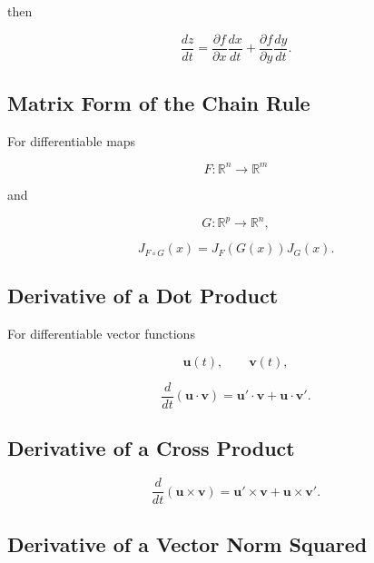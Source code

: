 then

\[
\boxed{
\frac{dz}{dt}
=
\frac{\partial f}{\partial x}
\frac{dx}{dt}
+
\frac{\partial f}{\partial y}
\frac{dy}{dt}.
}
\]

\subsection{Matrix Form of the Chain Rule}
\label{subsec:matrix-chain-rule-reference}

For differentiable maps

\[
F:\mathbb{R}^n\to\mathbb{R}^m
\]

and

\[
G:\mathbb{R}^p\to\mathbb{R}^n,
\]

\[
\boxed{
J_{F\circ G}(x)
=
J_F(G(x))
J_G(x).
}
\]

\subsection{Derivative of a Dot Product}
\label{subsec:dot-product-derivative}

For differentiable vector functions

\[
\mathbf{u}(t),
\qquad
\mathbf{v}(t),
\]

\[
\boxed{
\frac{d}{dt}
(\mathbf{u}\cdot\mathbf{v})
=
\mathbf{u}'\cdot\mathbf{v}
+
\mathbf{u}\cdot\mathbf{v}'.
}
\]

\subsection{Derivative of a Cross Product}
\label{subsec:cross-product-derivative}

\[
\boxed{
\frac{d}{dt}
(\mathbf{u}\times\mathbf{v})
=
\mathbf{u}'\times\mathbf{v}
+
\mathbf{u}\times\mathbf{v}'.
}
\]

\subsection{Derivative of a Vector Norm Squared}
\label{subsec:norm-squared-derivative}

